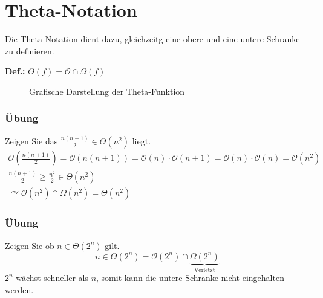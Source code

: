 \newpage
\section{Theta-Notation}
\label{sec:ThetaNotation}
Die Theta-Notation dient dazu, gleichzeitg eine obere und eine untere Schranke zu definieren.
\begin{shaded}
	\noindent
	\textbf{Def.:} \( \Theta(f) = \mathcal{O} \cap \Omega(f)\)
\end{shaded}
\begin{figure}[htbp]
	\begin{center}
	\end{center}
	\label{img:Theta}
	\caption{Grafische Darstellung der Theta-Funktion}
\end{figure}

\subsubsection{Übung}
Zeigen Sie das \(\frac{n(n+1)}{2} \in \Theta(n^{2})\) liegt.
\begin{eqnarray*}
	\mathcal{O}(\frac{n(n+1)}{2}) = \mathcal{O}(n(n+1)) = \mathcal{O}(n) \cdot \mathcal{O}(n+1) = \mathcal{O}(n) \cdot \mathcal{O}(n) = \mathcal{O}(n^{2}) \\
	\frac{n(n+1)}{2} \geq \frac{n^{2}}{2} \in \Theta(n^{2}) \\
	\curvearrowright \mathcal{O}(n^{2}) \cap \Omega(n^{2}) = \Theta(n^{2})
\end{eqnarray*}

\subsubsection{Übung}
Zeigen Sie ob \(n \in \Theta(2^n)\) gilt.
\[n \in \Theta(2^n) = \mathcal{O}(2^n) \cap \underbrace{\Omega(2^n)}_{\textrm{Verletzt}}\]
\(2^n	\) wächst schneller als \(n\), somit kann die untere Schranke nicht eingehalten werden.



